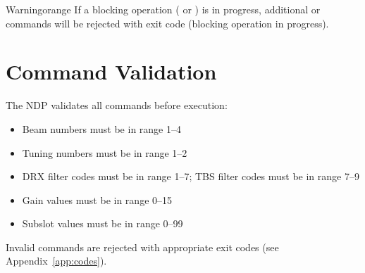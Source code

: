 \begin{calloutBox}{Warning}{orange}
If a blocking operation ( or ) is in progress, additional  or  commands will be rejected with exit code  (blocking operation in progress).
\end{calloutBox}

\section{Command Validation}

The NDP validates all commands before execution:
\begin{itemize}
    \item Beam numbers must be in range 1--4
    \item Tuning numbers must be in range 1--2
    \item DRX filter codes must be in range 1--7; TBS filter codes must be in range 7--9
    \item Gain values must be in range 0--15
    \item Subslot values must be in range 0--99
\end{itemize}

Invalid commands are rejected with appropriate exit codes (see Appendix~\ref{app:codes}).
